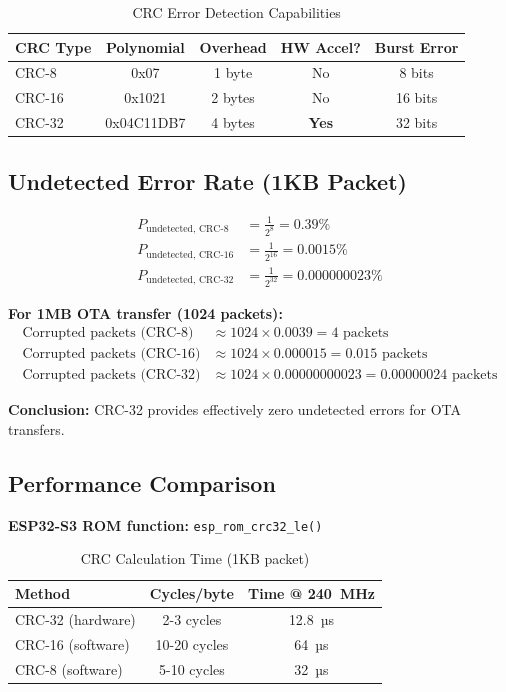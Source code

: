\documentclass[12pt,letterpaper]{article}
\begin{document}
\begin{table}[H]
\centering
\caption{CRC Error Detection Capabilities}
\begin{tabular}{lcccc}
\toprule
\textbf{CRC Type} & \textbf{Polynomial} & \textbf{Overhead} & \textbf{HW Accel?} & \textbf{Burst Error} \\
\midrule
CRC-8 & 0x07 & 1 byte & No & 8 bits \\
CRC-16 & 0x1021 & 2 bytes & No & 16 bits \\
CRC-32 & 0x04C11DB7 & 4 bytes & \textbf{Yes} & 32 bits \\
\bottomrule
\end{tabular}
\end{table}

\subsection{Undetected Error Rate (1KB Packet)}

\begin{align}
P_{\text{undetected, CRC-8}} &= \frac{1}{2^8} = 0.39\% \\
P_{\text{undetected, CRC-16}} &= \frac{1}{2^{16}} = 0.0015\% \\
P_{\text{undetected, CRC-32}} &= \frac{1}{2^{32}} = 0.000000023\%
\end{align}

\textbf{For 1MB OTA transfer (1024 packets):}
\begin{align}
\text{Corrupted packets (CRC-8)} &\approx 1024 \times 0.0039 = 4 \text{ packets} \\
\text{Corrupted packets (CRC-16)} &\approx 1024 \times 0.000015 = 0.015 \text{ packets} \\
\text{Corrupted packets (CRC-32)} &\approx 1024 \times 0.00000000023 = 0.00000024 \text{ packets}
\end{align}

\textbf{Conclusion:} CRC-32 provides effectively zero undetected errors for OTA transfers.

\subsection{Performance Comparison}

\textbf{ESP32-S3 ROM function:} \texttt{esp\_rom\_crc32\_le()}

\begin{table}[H]
\centering
\caption{CRC Calculation Time (1KB packet)}
\begin{tabular}{lcc}
\toprule
\textbf{Method} & \textbf{Cycles/byte} & \textbf{Time @ 240~MHz} \\
\midrule
CRC-32 (hardware) & 2-3 cycles & 12.8~µs \\
CRC-16 (software) & 10-20 cycles & 64~µs \\
CRC-8 (software) & 5-10 cycles & 32~µs \\
\bottomrule
\end{tabular}
\end{table}
\end{document}
